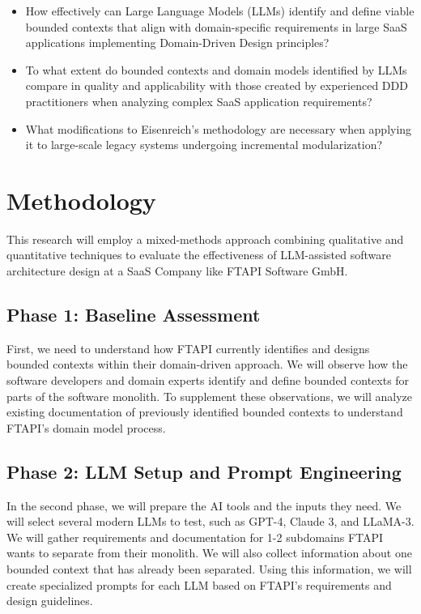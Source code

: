 \documentclass[12pt,a4paper]{article}
\begin{document}
\begin{itemize}
    \item How effectively can Large Language Models (LLMs) identify and define viable bounded contexts that align with domain-specific requirements in large SaaS applications implementing Domain-Driven Design principles?
    \item To what extent do bounded contexts and domain models identified by LLMs compare in quality and applicability with those created by experienced DDD practitioners when analyzing complex SaaS application requirements?
    \item What modifications to Eisenreich's methodology are necessary when applying it to large-scale legacy systems undergoing incremental modularization?
\end{itemize}



\section{Methodology}
This research will employ a mixed-methods approach combining qualitative and quantitative techniques to evaluate the effectiveness of LLM-assisted software architecture design at a SaaS Company like FTAPI Software GmbH.

\subsection{Phase 1: Baseline Assessment}
First, we need to understand how FTAPI currently identifies and designs bounded contexts within their domain-driven approach. We will observe how the software developers and domain experts identify and define bounded contexts for parts of the software monolith. To supplement these observations, we will analyze existing documentation of previously identified bounded contexts to understand FTAPI's domain model process.

\subsection{Phase 2: LLM Setup and Prompt Engineering}
In the second phase, we will prepare the AI tools and the inputs they need. We will select several modern LLMs to test, such as GPT-4, Claude 3, and LLaMA-3. We will gather requirements and documentation for 1-2 subdomains FTAPI wants to separate from their monolith. We will also collect information about one bounded context that has already been separated. Using this information, we will create specialized prompts for each LLM based on FTAPI's requirements and design guidelines.
\end{document}
